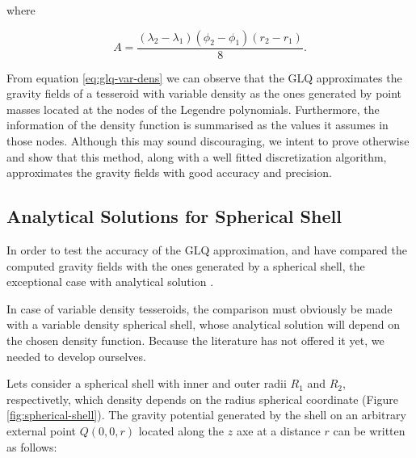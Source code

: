 \documentclass[extra]{gji}
\begin{document}
\noindent where

\begin{equation}
    A = 
    \frac{(\lambda_2 - \lambda_1)(\phi_2 - \phi_1)(r_2 - r_1)}{8}.
\end{equation}

From equation \ref{eq:glq-var-dens} we can observe that the GLQ approximates the gravity fields of a tesseroid with variable density as the ones generated by point masses located at the nodes of the Legendre polynomials.
Furthermore, the information of the density function is summarised as the values it assumes in those nodes.
Although this may sound discouraging, we intent to prove otherwise and show that this method, along with a well fitted discretization algorithm, approximates the gravity fields with good accuracy and precision.


\subsection{Analytical Solutions for Spherical Shell}

In order to test the accuracy of the GLQ approximation, \citet{Uieda2016} and \citet{Grombein2013} have compared the computed gravity fields with the ones generated by a spherical shell, the exceptional case with analytical solution \citep{Mikuska2006,Grombein2013}.

In case of variable density tesseroids, the comparison must obviously be made with a variable density spherical shell, whose analytical solution will depend on the chosen density function.
Because the literature has not offered it yet, we needed to develop ourselves.

Lets consider a spherical shell with inner and outer radii $R_1$ and $R_2$, respectivetly, which density depends on the radius spherical coordinate (Figure \ref{fig:spherical-shell}).
The gravity potential generated by the shell on an arbitrary external point $Q(0,0,r)$ located along the $z$ axe at a distance $r$ can be written as follows:
\end{document}

